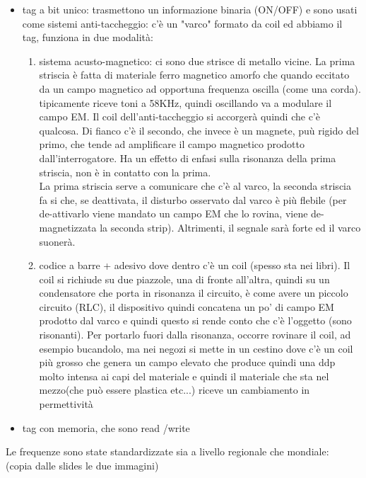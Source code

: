 \documentclass[oneside, 12pt]{extbook}
\begin{document}
\begin{itemize}
	\item tag a bit unico: trasmettono un informazione binaria (ON/OFF) e sono usati come sistemi anti-taccheggio: c'è un "varco" formato da coil ed abbiamo il tag, funziona in due modalità:
	\begin{enumerate}
		\item sistema acusto-magnetico: ci sono due strisce di metallo vicine. La prima striscia è fatta di materiale ferro magnetico amorfo che quando eccitato da un campo magnetico ad opportuna frequenza oscilla (come una corda). tipicamente riceve toni a 58KHz, quindi oscillando va a modulare il campo EM. Il coil dell'anti-taccheggio si accorgerà quindi che c'è qualcosa. Di fianco c'è il secondo, che invece è un magnete, puù rigido del primo, che tende ad amplificare il campo magnetico prodotto dall'interrogatore. Ha un effetto di enfasi sulla risonanza della prima striscia, non è in contatto con la prima.\\La prima striscia serve a comunicare che c'è al varco, la seconda striscia fa si che, se deattivata, il disturbo osservato dal varco è più flebile (per de-attivarlo viene mandato un campo EM che lo rovina, viene de-magnetizzata la seconda strip). Altrimenti, il segnale sarà forte ed il varco suonerà.
		\item codice a barre + adesivo dove dentro c'è un coil (spesso sta nei libri). Il coil si richiude su due piazzole, una di fronte all'altra, quindi su un condensatore che porta in risonanza il circuito, è come avere un piccolo circuito (RLC), il dispositivo quindi concatena un po' di campo EM prodotto dal varco e quindi questo si rende conto che c'è l'oggetto (sono risonanti). Per portarlo fuori dalla risonanza, occorre rovinare il coil, ad esempio bucandolo, ma nei negozi si mette in un cestino dove c'è un coil più grosso che genera un campo elevato che produce quindi una ddp molto intensa ai capi del materiale e quindi il materiale che sta nel mezzo(che può essere plastica etc...) riceve un cambiamento in permettività 
	\end{enumerate}
	\item tag con memoria, che sono read /write
\end{itemize}
Le frequenze sono state standardizzate sia a livello regionale che mondiale:\\
(copia dalle slides le due immagini)
\end{document}
